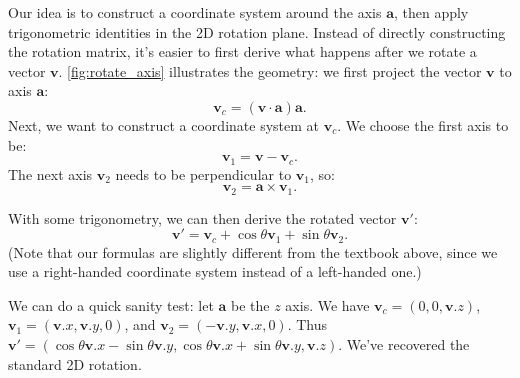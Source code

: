 Our idea is to construct a coordinate system around the axis $\mathbf{a}$, then apply trigonometric identities in the 2D rotation plane. Instead of directly constructing the rotation matrix, it's easier to first derive what happens after we rotate a vector $\mathbf{v}$. \cref{fig:rotate_axis} illustrates the geometry: we first project the vector $\mathbf{v}$ to axis $\mathbf{a}$:
\begin{equation}
\mathbf{v}_c = \left(\mathbf{v} \cdot \mathbf{a}\right)\mathbf{a}.
\end{equation}
Next, we want to construct a coordinate system at $\mathbf{v}_c$. We choose the first axis to be:
\begin{equation}
\mathbf{v}_1 = \mathbf{v} - \mathbf{v}_c.
\end{equation}
The next axis $\mathbf{v}_2$ needs to be perpendicular to $\mathbf{v}_1$, so:
\begin{equation}
\mathbf{v}_2 = \mathbf{a} \times \mathbf{v}_1.
\end{equation}

With some trigonometry, we can then derive the rotated vector $\mathbf{v}'$:
\begin{equation}
\mathbf{v}' = \mathbf{v}_c + \cos\theta \mathbf{v}_1 + \sin\theta \mathbf{v}_2.
\end{equation}
(Note that our formulas are slightly different from the textbook above, since we use a right-handed coordinate system instead of a left-handed one.)

We can do a quick sanity test: let $\mathbf{a}$ be the $z$ axis. We have $\mathbf{v}_c = \left(0, 0, \mathbf{v}.z\right)$, $\mathbf{v}_1 = \left(\mathbf{v}.x, \mathbf{v}.y, 0\right)$, and $\mathbf{v}_2 = \left(-\mathbf{v}.y, \mathbf{v}.x, 0\right)$. Thus $\mathbf{v}' = \left(\cos\theta \mathbf{v}.x - \sin\theta \mathbf{v}.y, \cos\theta \mathbf{v}.x + \sin\theta \mathbf{v}.y, \mathbf{v}.z\right)$. We've recovered the standard 2D rotation.

